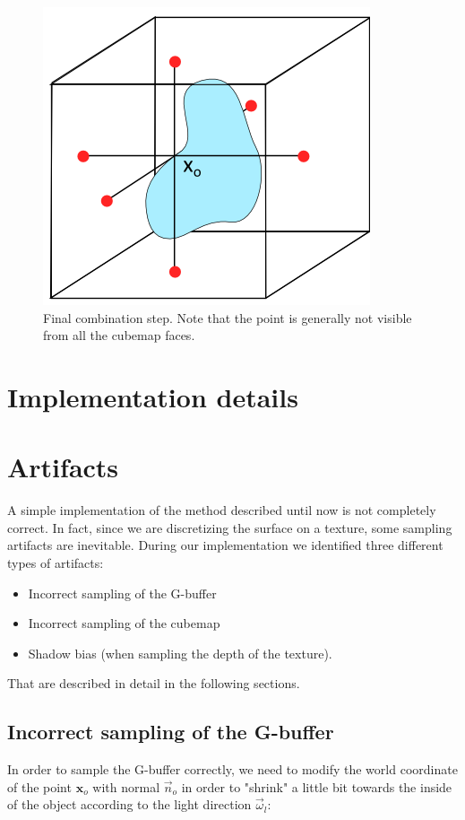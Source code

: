 \begin{figure}[!ht]
\centering
\includegraphics[width=0.5 \linewidth]{images/method/method_step3}
\caption{Final combination step. Note that the point is generally not visible from all the cubemap faces.}
\label{fig:step3}
\end{figure} 

\clearpage
\section{Implementation details}

\section{Artifacts}
A simple implementation of the method described until now is not completely correct. In fact, since we are discretizing the surface on a texture, some sampling artifacts are inevitable. During our implementation we identified three different types of artifacts:

\begin{itemize}
	\item Incorrect sampling of the G-buffer
	\item Incorrect sampling of the cubemap
	\item Shadow bias (when sampling the depth of the texture).
\end{itemize}

That are described in detail in the following sections.

\subsection{Incorrect sampling of the G-buffer}

In order to sample the G-buffer correctly, we need to modify the world coordinate of the point $\mathbf{x}_o$ with normal $\vec{n}_o$ in order to "shrink" a little bit towards the inside of the object according to the light direction $\vec{\omega}_l$:

